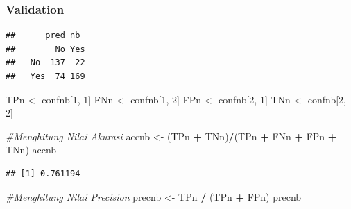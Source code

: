 \documentclass[]{article}
\newenvironment{Shaded}{\begin{snugshade}}{\end{snugshade}}
\newcommand{\CommentTok}[1]{\textcolor[rgb]{0.56,0.35,0.01}{\textit{#1}}}
\newcommand{\DecValTok}[1]{\textcolor[rgb]{0.00,0.00,0.81}{#1}}
\newcommand{\KeywordTok}[1]{\textcolor[rgb]{0.13,0.29,0.53}{\textbf{#1}}}
\newcommand{\NormalTok}[1]{#1}
\newcommand{\OperatorTok}[1]{\textcolor[rgb]{0.81,0.36,0.00}{\textbf{#1}}}
\newcommand{\StringTok}[1]{\textcolor[rgb]{0.31,0.60,0.02}{#1}}
\begin{document}
\hypertarget{validation-1}{%
\subsubsection{Validation}\label{validation-1}}

\begin{Shaded}
\end{Shaded}

\begin{verbatim}
##      pred_nb
##        No Yes
##   No  137  22
##   Yes  74 169
\end{verbatim}

\begin{Shaded}
\begin{Highlighting}[]
\NormalTok{TPn <-}\StringTok{ }\NormalTok{confnb[}\DecValTok{1}\NormalTok{, }\DecValTok{1}\NormalTok{] }
\NormalTok{FNn <-}\StringTok{ }\NormalTok{confnb[}\DecValTok{1}\NormalTok{, }\DecValTok{2}\NormalTok{] }
\NormalTok{FPn <-}\StringTok{ }\NormalTok{confnb[}\DecValTok{2}\NormalTok{, }\DecValTok{1}\NormalTok{] }
\NormalTok{TNn <-}\StringTok{ }\NormalTok{confnb[}\DecValTok{2}\NormalTok{, }\DecValTok{2}\NormalTok{] }
\end{Highlighting}
\end{Shaded}

\begin{Shaded}
\begin{Highlighting}[]
\CommentTok{#Menghitung Nilai Akurasi}
\NormalTok{accnb <-}\StringTok{ }\NormalTok{(TPn }\OperatorTok{+}\StringTok{ }\NormalTok{TNn)}\OperatorTok{/}\NormalTok{(TPn }\OperatorTok{+}\StringTok{ }\NormalTok{FNn }\OperatorTok{+}\StringTok{ }\NormalTok{FPn }\OperatorTok{+}\StringTok{ }\NormalTok{TNn)}
\NormalTok{accnb}
\end{Highlighting}
\end{Shaded}

\begin{verbatim}
## [1] 0.761194
\end{verbatim}

\begin{Shaded}
\begin{Highlighting}[]
\CommentTok{#Menghitung Nilai Precision}
\NormalTok{precnb <-}\StringTok{ }\NormalTok{TPn }\OperatorTok{/}\StringTok{ }\NormalTok{(TPn }\OperatorTok{+}\StringTok{ }\NormalTok{FPn)}
\NormalTok{precnb}
\end{Highlighting}
\end{Shaded}
\end{document}
